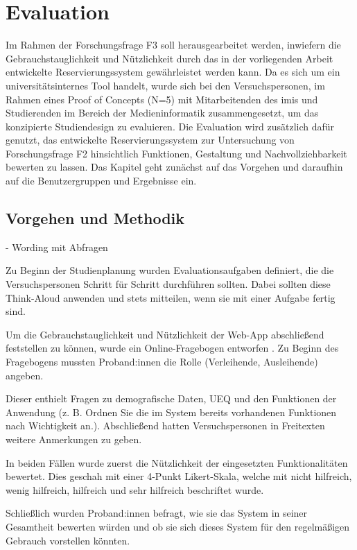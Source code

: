 
\chapter{Evaluation}
\label{chapter-evaluation}
Im Rahmen der Forschungsfrage F3 soll herausgearbeitet werden, inwiefern die Gebrauchstauglichkeit
und Nützlichkeit durch das in der vorliegenden Arbeit entwickelte Reservierungssystem gewährleistet
werden kann. Da es sich um ein universitätsinternes Tool handelt, wurde sich
bei den Versuchspersonen, im Rahmen eines Proof of Concepts (N=5) mit Mitarbeitenden des \ac{imis}
und Studierenden im Bereich der Medieninformatik zusammengesetzt, um das konzipierte Studiendesign
zu evaluieren. Die Evaluation wird zusätzlich dafür genutzt, das entwickelte Reservierungssystem zur
Untersuchung von Forschungsfrage F2 hinsichtlich Funktionen, Gestaltung und Nachvollziehbarkeit
bewerten zu lassen. Das Kapitel geht zunächst auf das Vorgehen und daraufhin auf die Benutzergruppen
und Ergebnisse ein.


\section{Vorgehen und Methodik}
- Wording mit Abfragen


Zu Beginn der Studienplanung wurden Evaluationsaufgaben definiert, die die Versuchspersonen Schritt
für Schritt durchführen sollten. Dabei sollten diese Think-Aloud anwenden und stets mitteilen, wenn sie
mit einer Aufgabe fertig sind.

Um die Gebrauchstauglichkeit und Nützlichkeit der Web-App abschließend feststellen zu können, wurde ein
Online-Fragebogen entworfen . Zu Beginn des Fragebogens mussten Proband:innen die Rolle
(Verleihende, Ausleihende) angeben.

Dieser enthielt Fragen zu demografische Daten, UEQ und
den Funktionen der Anwendung (z. B. Ordnen Sie die im System bereits vorhandenen Funktionen nach
Wichtigkeit an.). Abschließend hatten Versuchspersonen in Freitexten weitere Anmerkungen zu geben.

In beiden Fällen wurde zuerst die Nützlichkeit der eingesetzten Funktionalitäten bewertet. Dies geschah mit einer
4-Punkt Likert-Skala, welche mit nicht hilfreich, wenig hilfreich, hilfreich und sehr hilfreich beschriftet
wurde.

Schließlich wurden Proband:innen befragt, wie sie das System in seiner Gesamtheit bewerten würden
und ob sie sich dieses System für den regelmäßigen Gebrauch vorstellen könnten.


